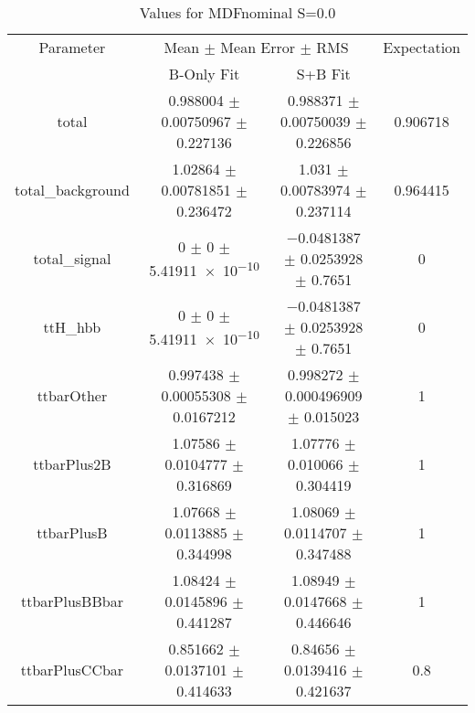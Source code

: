 \begin{table}
\centering
\caption{Values for MDFnominal S=0.0}
\begin{tabular}{cccc}
\toprule
Parameter & \multicolumn{2}{c}{Mean $\pm$ Mean Error $\pm$ RMS} & Expectation\\
 & B-Only Fit & S+B Fit & \\
\midrule
total & \num{0.988004} $\pm$ \num{0.00750967} $\pm$ \num{0.227136} & \num{0.988371} $\pm$ \num{0.00750039} $\pm$ \num{0.226856} & \num{0.906718}\\
total\_background & \num{1.02864} $\pm$ \num{0.00781851} $\pm$ \num{0.236472} & \num{1.031} $\pm$ \num{0.00783974} $\pm$ \num{0.237114} & \num{0.964415}\\
total\_signal & \num{0} $\pm$ \num{0} $\pm$ \num{5.41911e-10} & \num{-0.0481387} $\pm$ \num{0.0253928} $\pm$ \num{0.7651} & \num{0}\\
ttH\_hbb & \num{0} $\pm$ \num{0} $\pm$ \num{5.41911e-10} & \num{-0.0481387} $\pm$ \num{0.0253928} $\pm$ \num{0.7651} & \num{0}\\
ttbarOther & \num{0.997438} $\pm$ \num{0.00055308} $\pm$ \num{0.0167212} & \num{0.998272} $\pm$ \num{0.000496909} $\pm$ \num{0.015023} & \num{1}\\
ttbarPlus2B & \num{1.07586} $\pm$ \num{0.0104777} $\pm$ \num{0.316869} & \num{1.07776} $\pm$ \num{0.010066} $\pm$ \num{0.304419} & \num{1}\\
ttbarPlusB & \num{1.07668} $\pm$ \num{0.0113885} $\pm$ \num{0.344998} & \num{1.08069} $\pm$ \num{0.0114707} $\pm$ \num{0.347488} & \num{1}\\
ttbarPlusBBbar & \num{1.08424} $\pm$ \num{0.0145896} $\pm$ \num{0.441287} & \num{1.08949} $\pm$ \num{0.0147668} $\pm$ \num{0.446646} & \num{1}\\
ttbarPlusCCbar & \num{0.851662} $\pm$ \num{0.0137101} $\pm$ \num{0.414633} & \num{0.84656} $\pm$ \num{0.0139416} $\pm$ \num{0.421637} & \num{0.8}\\
\bottomrule
\end{tabular}
\end{table}